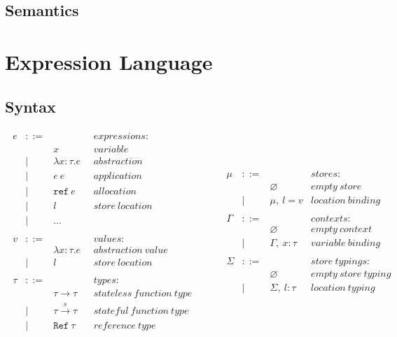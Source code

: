 \documentclass{llncs}
\newcommand{\reftt}{\mathtt{ref}~}
\newcommand{\Reftt}{\mathtt{Ref}~}
\begin{document}
\subsection{Semantics}

\vspace{20pt}

\section{Expression Language}

\subsection{Syntax}

\[
\begin{array}{lll}
\begin{array}{lllr}
e & ::= & & expressions \colon\\
& & x & variable\\
& | & \lambda x : \tau . e & abstraction\\
& | & e~e & application\\
& | & \reftt e & allocation\\
& | & l & store~location\\
& | & ...\\
&&&\\
v & ::= & & values \colon\\
& & \lambda x : \tau . e & abstraction~value\\
& | & l & store~location\\
&&&\\
\tau & ::= & & types \colon\\
& & \tau \rightarrow \tau & stateless~function~type\\
& | & \tau \xrightarrow{s} \tau~~~~& stateful~function~type\\
& | & \Reftt \tau & reference~type
\end{array}
& ~~~~~
&
\begin{array}{lllr}
\mu & ::= & & stores \colon\\
& & \varnothing & empty~store\\
& | & \mu,~l = v & location~binding\\
&&&\\
\Gamma & ::= & & contexts \colon\\
& & \varnothing & empty~context\\
& | & \Gamma,~x : \tau & variable~binding\\
&&&\\
\Sigma & ::= & & store~typings \colon\\
& & \varnothing & empty~store~typing\\
& | & \Sigma,~l : \tau & location~typing
\end{array}
\end{array}
\]
\end{document}
